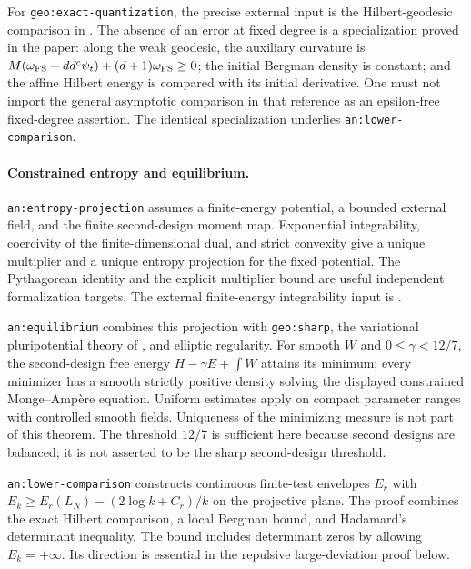For \texttt{geo:exact-quantization}, the precise external input is the
Hilbert-geodesic comparison in \citet[Proposition 4.1]{geo_zhang2024}.
The absence of an error at fixed degree is a specialization proved in
the paper: along the weak geodesic, the auxiliary curvature is
$M(\omega_{\rm FS}+dd^c\psi_t)+(d+1)\omega_{\rm FS}\ge0$;
the initial Bergman density is constant; and the affine Hilbert energy
is compared with its initial derivative. One must not import the
general asymptotic comparison in that reference as an epsilon-free
fixed-degree assertion. The identical specialization underlies
\texttt{an:lower-comparison}.

\paragraph{Constrained entropy and equilibrium.}
\texttt{an:entropy-projection} assumes a finite-energy potential,
a bounded external field, and the finite second-design moment map.
Exponential integrability, coercivity of the finite-dimensional dual,
and strict convexity give a unique multiplier and a unique entropy
projection for the fixed potential. The Pythagorean identity and the
explicit multiplier bound are useful independent formalization targets.
The external finite-energy integrability input is
\citet[Proposition 1.4]{BBEGZ2019}.

\texttt{an:equilibrium} combines this projection with
\texttt{geo:sharp}, the variational pluripotential theory of
\citet{BBGZ2013}, and elliptic regularity. For smooth $W$ and
$0\le\gamma<12/7$, the second-design free energy
$H-\gamma E+\int W$ attains its minimum; every minimizer has a smooth
strictly positive density solving the displayed constrained
Monge--Amp\`ere equation. Uniform estimates apply on compact parameter
ranges with controlled smooth fields. Uniqueness of the minimizing
measure is not part of this theorem. The threshold $12/7$ is sufficient
here because second designs are balanced; it is not asserted to be the
sharp second-design threshold.

\texttt{an:lower-comparison} constructs continuous finite-test envelopes
$E_r$ with
$E_k\ge E_r(L_N)-(2\log k+C_r)/k$ on the projective plane.
The proof combines the exact Hilbert comparison, a local Bergman bound,
and Hadamard's determinant inequality. The bound includes determinant
zeros by allowing $E_k=+\infty$. Its direction is essential in the
repulsive large-deviation proof below.

